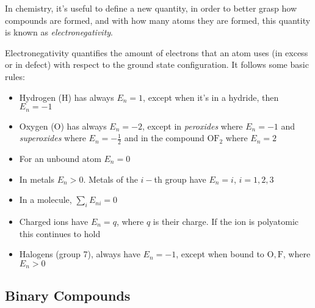 \documentclass[../qm.tex]{subfiles}
\begin{document}
In chemistry, it's useful to define a new quantity, in order to better grasp how compounds are formed, and with how many atoms they are formed, this quantity is known as \emph{electronegativity}. 
\begin{dfn}[Electronegativity]
	Electronegativity quantifies the amount of electrons that an atom uses (in excess or in defect) with respect to the ground state configuration. It follows some basic rules:
	\begin{itemize}
	\item Hydrogen ($\mathrm{H}$) has always $E_n=1$, except when it's in a hydride, then $E_n=-1$
	\item Oxygen ($\mathrm{O}$) has always $E_n=-2$, except in \textit{peroxides} where $E_n=-1$ and \textit{superoxides} where $E_n=-\frac{1}{2}$ and in the compound $\mathrm{OF_2}$ where $E_n=2$
	\item For an unbound atom $E_n=0$
	\item In metals $E_n>0$. Metals of the $i-$th group have $E_n=i$, $i=1,2,3$
	\item In a molecule, $\sum_iE_{ni}=0$
	\item Charged ions have $E_n=q$, where $q$ is their charge. If the ion is polyatomic this continues to hold
	\item Halogens (group 7), always have $E_n=-1$, except when bound to $\mathrm{O}, \mathrm{F}$, where $E_n>0$
	\end{itemize}
\end{dfn}
\subsection{Binary Compounds}
\end{document}

